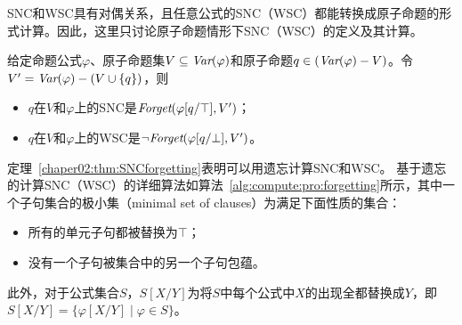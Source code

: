 SNC和WSC具有对偶关系，且任意公式的SNC（WSC）都能转换成原子命题的形式计算\cite{DBLP:journals/ai/Lin01}。因此，这里只讨论原子命题情形下SNC（WSC）的定义及其计算。%

\begin{theorem}\label{chaper02:thm:SNCforgetting}
	给定命题公式$\varphi$、原子命题集$V\subseteq \textit{Var}(\varphi)$和原子命题$q\in (\textit{Var}(\varphi)-V)$。令$V'= \textit{Var}(\varphi) - (V\cup \{q\})$，则
	\begin{itemize}
		\item $q$在$V$和$\varphi$上的SNC是$\textit{Forget}(\varphi[q/\top], V')$；
		\item $q$在$V$和$\varphi$上的WSC是$\neg \textit{Forget}(\varphi[q/\bot], V')$。
	\end{itemize}
\end{theorem}


定理~\ref{chaper02:thm:SNCforgetting}表明可以用遗忘计算SNC和WSC。
基于遗忘的计算SNC（WSC）的详细算法如算法~\ref{alg:compute:pro:forgetting}所示，其中一个子句集合的极小集（minimal set of clauses）为满足下面性质的集合：
\begin{itemize}
	\item 所有的单元子句都被替换为$\top$；
	\item 没有一个子句被集合中的另一个子句包蕴。
\end{itemize}
此外，对于公式集合$S$，$S[X/Y]$为将$S$中每个公式中$X$的出现全都替换成$Y$，即$S[X/Y]=\{\varphi[X/Y]\mid \varphi\in S\}$。


